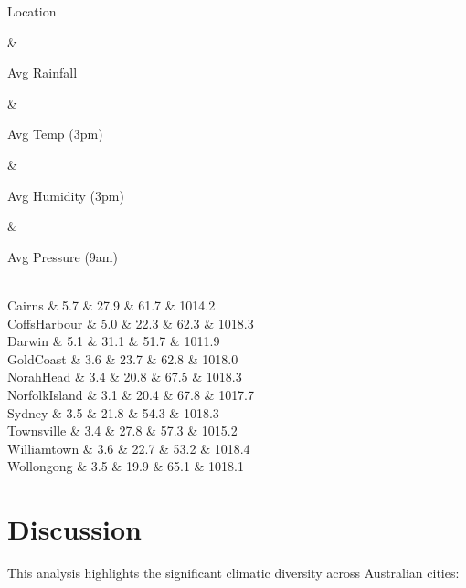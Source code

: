 \documentclass[
  letterpaper,
  DIV=11,
  numbers=noendperiod]{scrartcl}
\newenvironment{Shaded}{\begin{snugshade}}{\end{snugshade}}
\begin{document}
\begin{Shaded}
\begin{Highlighting}[]
\begin{Shaded}
\begin{Highlighting}[]
\begin{Shaded}
\begin{Highlighting}[]
\begin{Shaded}
\begin{Highlighting}[]
\begin{longtable}[]
\toprule\noalign{}
\begin{minipage}[b]{\linewidth}\raggedright
Location
\end{minipage} & \begin{minipage}[b]{\linewidth}\raggedleft
Avg Rainfall
\end{minipage} & \begin{minipage}[b]{\linewidth}\raggedleft
Avg Temp (3pm)
\end{minipage} & \begin{minipage}[b]{\linewidth}\raggedleft
Avg Humidity (3pm)
\end{minipage} & \begin{minipage}[b]{\linewidth}\raggedleft
Avg Pressure (9am)
\end{minipage} \\
\midrule\noalign{}
\endhead
\bottomrule\noalign{}
\endlastfoot
Cairns & 5.7 & 27.9 & 61.7 & 1014.2 \\
CoffsHarbour & 5.0 & 22.3 & 62.3 & 1018.3 \\
Darwin & 5.1 & 31.1 & 51.7 & 1011.9 \\
GoldCoast & 3.6 & 23.7 & 62.8 & 1018.0 \\
NorahHead & 3.4 & 20.8 & 67.5 & 1018.3 \\
NorfolkIsland & 3.1 & 20.4 & 67.8 & 1017.7 \\
Sydney & 3.5 & 21.8 & 54.3 & 1018.3 \\
Townsville & 3.4 & 27.8 & 57.3 & 1015.2 \\
Williamtown & 3.6 & 22.7 & 53.2 & 1018.4 \\
Wollongong & 3.5 & 19.9 & 65.1 & 1018.1 \\

\end{longtable}

\section{Discussion}\label{discussion}

This analysis highlights the significant climatic diversity across
Australian cities:


\end{Highlighting}
\end{Shaded}
\end{Highlighting}
\end{Shaded}
\end{Highlighting}
\end{Shaded}
\end{Highlighting}
\end{Shaded}
\end{document}
